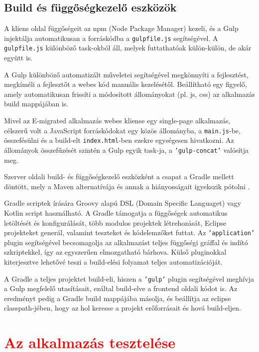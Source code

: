 \begin{reviewed}
\section{Build és függőségkezelő eszközök}
\label{subsec:gradle}
A kliens oldal függőségeit az npm (Node Package Manager) \cite{npm} kezeli, és a Gulp \cite{gulp} injektálja automatikusan a forráskódba a \texttt{gulpfile.js} segítségével. A \texttt{gulpfile.js} különböző task-okból áll, melyek futtathatóak külön-külön, de akár együtt is. 

A Gulp különböző automatizált műveletei segítségével megkönnyíti a fejlesztést, megkíméli a fejlesztőt a webes kód manuális kezelésétől. Beállítható egy figyelő, amely automatikusan frissíti a módosított állományokat (pl. js, css) az alkalmazás build mappájában is. 

Mivel az E-migrated alkalmazás webes kliense egy single-page alkalmazás, célszerű volt a JavaScript forráskódokat egy közös állományba, a \texttt{main.js}-be, összefésülni és a build-elt \texttt{index.html}-ben ezekre egységesen hivatkozni. Az állományok összefűzését szintén a Gulp egyik task-ja, a \texttt{'gulp-concat'} valósítja meg.  

Szerver oldali build- és függőségkezelő eszközként a csapat a Gradle mellett döntött, mely a Maven alternatívája és annak a hiányosságait igyekszik pótolni \cite{Gradle,GradleDoc}. 

Gradle scriptek írására Groovy alapú DSL (Domain Specific Languaget) vagy Kotlin script használható.  A Gradle támogatja a függőségek automatikus letöltését és konfigurálását, több modulos projektek létrehozását, Eclipse projekteket generál, valamint teszteket és kódelemzőket futtat. Az \texttt{'application'} plugin segítségével becsomagolja az alkalmazást teljes függőségi gráffal és indító szkriptekkel, így az egyszerűen elmozgatható bárhova. Külső pluginokkal kiterjesztve lehetővé teszi a build-elési folyamat teljes automatizációját. 

A Gradle a teljes projektet build-eli, hiszen a \texttt{'gulp'} plugin segítségével meghívja a Gulp megfelelő utasításait, ezáltal build-elve a frontend oldali kódot is. Az eredményt pedig a Gradle build mappájába másolja, és beállítja az eclipse classpath-jében, hogy az hol keresse a projekt erőforrásait és hová build-eljen. 
\end{reviewed}
\section{\textcolor{red}{Az alkalmazás tesztelése}}
\label{sec:tesztek}

